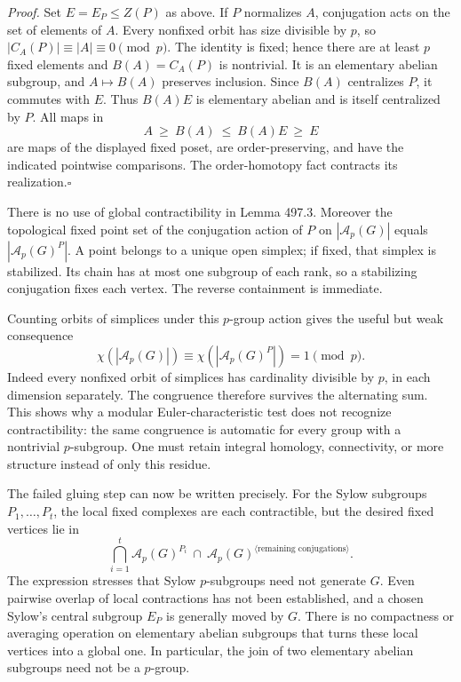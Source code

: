 \documentclass[11pt]{article}
\begin{document}
\emph{Proof.}
Set $E=E_P\leq Z(P)$ as above. If $P$ normalizes $A$, conjugation acts
on the set of elements of $A$. Every nonfixed orbit has size divisible by
$p$, so $|C_A(P)|\equiv |A|\equiv0\pmod p$. The identity is fixed;
hence there are at least $p$ fixed elements and $B(A)=C_A(P)$ is
nontrivial. It is an elementary abelian subgroup, and $A\mapsto B(A)$
preserves inclusion. Since $B(A)$ centralizes $P$, it commutes with $E$.
Thus $B(A)E$ is elementary abelian and is itself centralized by $P$.
All maps in
\[
 A\ \geq\ B(A)\ \leq\ B(A)E\ \geq\ E
\]
are maps of the displayed fixed poset, are order-preserving, and have the
indicated pointwise comparisons. The order-homotopy fact contracts its
realization.\hfill$\square$

There is no use of global contractibility in Lemma 497.3. Moreover the
topological fixed point set of the conjugation action of $P$ on
$|\mathcal A_p(G)|$ equals $|\mathcal A_p(G)^P|$. A point belongs to a
unique open simplex; if fixed, that simplex is stabilized. Its chain has
at most one subgroup of each rank, so a stabilizing conjugation fixes
each vertex. The reverse containment is immediate.

Counting orbits of simplices under this $p$-group action gives the useful
but weak consequence
\begin{equation}\label{ra497:euler}
 \chi(|\mathcal A_p(G)|)\equiv
 \chi(|\mathcal A_p(G)^P|)=1\pmod p.
\end{equation}
Indeed every nonfixed orbit of simplices has cardinality divisible by
$p$, in each dimension separately. The congruence therefore survives the
alternating sum. This shows why a modular Euler-characteristic test does
not recognize contractibility: the same congruence is automatic for every
group with a nontrivial $p$-subgroup. One must retain integral homology,
connectivity, or more structure instead of only this residue.

The failed gluing step can now be written precisely. For the Sylow
subgroups $P_1,\ldots,P_t$, the local fixed complexes are each
contractible, but the desired fixed vertices lie in
\[
 \bigcap_{i=1}^t\mathcal A_p(G)^{P_i}
       \ \cap\ \mathcal A_p(G)^{\langle\text{remaining conjugations}\rangle}.
\]
The expression stresses that Sylow $p$-subgroups need not generate $G$.
Even pairwise overlap of local contractions has not been established,
and a chosen Sylow's central subgroup $E_P$ is generally moved by $G$.
There is no compactness or averaging operation on elementary abelian
subgroups that turns these local vertices into a global one. In particular,
the join of two elementary abelian subgroups need not be a $p$-group.
\end{document}
